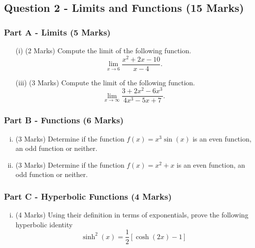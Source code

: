 ﻿ \documentclass[a4paper,12pt]{article}
\begin{document}
\bigskip
\subsection*{Question 2 - Limits and Functions (15 Marks)}
\subsubsection*{Part A - Limits (5 Marks)}
\begin{enumerate}
	\item[(i)] (2 Marks)  Compute the limit of the following function.
		{
			\large
	\[\lim_{x \to 6 } \frac{x^2 + 2x-10}{x-4}.\]
}
	\bigskip
	
	\item[(iii)] (3 Marks) Compute the limit of the following function.
		{
			\large
	\[ \lim_{x \to \infty } \frac{3 + 2x^2 - 6x^3 }{4x^3 - 5x + 7}. \]	
}
\end{enumerate}
\medskip
\subsubsection*{Part B - Functions (6 Marks)}
\begin{enumerate}[(i)]
	\item (3 Marks) Determine if the function $f(x) = x^3\sin(x)$ is an even function, an odd function or neither.
	\bigskip
		\item (3 Marks) Determine if the function $f(x) = x^2+x$ is an even function, an odd function or neither.
		\bigskip
\end{enumerate}
\medskip
\subsubsection*{Part C - Hyperbolic Functions (4 Marks)}


\begin{enumerate}[(i)]
	\item (4 Marks) Using their definition in terms of exponentials, prove the following hyperbolic identity   
	{
		\large
	\[\sinh^2 (x) = \frac{1}{2}\left[\cosh(2x)-1\right]\]
}
	
\end{enumerate}
\end{document}
